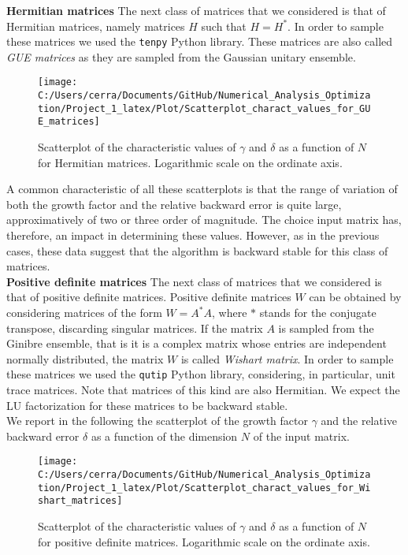 \documentclass[a4paper,11pt]{report}
\begin{document}
\noindent \textbf{Hermitian matrices }  The next class of matrices that we considered is that of Hermitian matrices, namely matrices $H$ such that $H = H^{*}$. In order to sample these matrices we used the \texttt{tenpy} Python library. These matrices are also called \textit{GUE matrices} as they are sampled from the Gaussian unitary ensemble.

\begin{figure}[H]
	\centering
	\texttt{[image: C:/Users/cerra/Documents/GitHub/Numerical\_Analysis\_Optimization/Project\_1\_latex/Plot/Scatterplot\_charact\_values\_for\_GUE\_matrices]}
	\caption{Scatterplot of the characteristic values of $\gamma$ and $\delta$ as a function of $N$ for Hermitian matrices. Logarithmic scale on the ordinate axis.}
	\label{fig:Scatterplot_GUE}
\end{figure}

\noindent A common characteristic of all these scatterplots is that the range of variation of both the growth factor and the relative backward error is quite large, approximatively of two or three order of magnitude. The choice input matrix has, therefore, an impact in determining these values. However, as in the previous cases, these data suggest that the algorithm is backward stable for this class of matrices.\\

\noindent \textbf{Positive definite matrices } The next class of matrices that we considered is that of positive definite matrices. Positive definite matrices $W$ can be obtained by considering matrices of the form $W = A^{*}A$, where $*$ stands for the conjugate transpose, discarding singular matrices. If the matrix $A$ is sampled from the Ginibre ensemble, that is it is a complex matrix whose entries are independent normally distributed, the matrix $W$ is called \textit{Wishart matrix}. In order to sample these matrices we used the \texttt{qutip} Python library, considering, in particular, unit trace matrices. Note that matrices of this kind are also Hermitian. We expect the LU factorization for these matrices to be backward stable.\\

\noindent We report in the following the scatterplot of the growth factor $\gamma$ and the relative backward error $\delta$ as a function of the dimension $N$ of the input matrix.

\begin{figure}[H]
	\centering
	\texttt{[image: C:/Users/cerra/Documents/GitHub/Numerical\_Analysis\_Optimization/Project\_1\_latex/Plot/Scatterplot\_charact\_values\_for\_Wishart\_matrices]}
	\caption{Scatterplot of the characteristic values of $\gamma$ and $\delta$ as a function of $N$ for positive definite matrices. Logarithmic scale on the ordinate axis.}
	\label{fig:Scatterplot_Wishart}
\end{figure}
\end{document}
